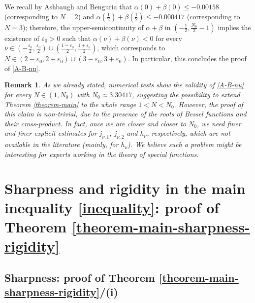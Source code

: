 \documentclass[11pt, reqno]{amsart}
\newtheorem{remark}{Remark}[section]
\numberwithin{equation}{section}
\begin{document}
	We recall by Ashbaugh and Benguria \cite[Appendix 1]{A-B-Duke} that $\alpha(0)+\beta(0)\leq -0.00158$ (corresponding to $N=2$) and 	$\alpha(\frac{1}{2})+\beta(\frac{1}{2})\leq -0.000417$ (corresponding to $N=3$); therefore, the upper-semicontinuity of $\alpha+\beta$ in $(-\frac{1}{2},\frac{N_0}{2}-1)$ implies the existence of $\varepsilon_0>0$ such that $\alpha(\nu)+\beta(\nu)<0$ for every $\nu\in \left(-\frac{\varepsilon_0}{2},\frac{\varepsilon_0}{2}\right)\cup \left(\frac{1-\varepsilon_0}{2},\frac{1+\varepsilon_0}{2}\right)$, which corresponds to $N\in (2-\varepsilon_0,2+\varepsilon_0)\cup (3-\varepsilon_0,3+\varepsilon_0)$. In particular, this concludes the proof of \eqref{A-B-nu}.  
	
	\begin{remark}\label{remark-dimension}\rm 
		As we already stated, numerical tests show the validity of \eqref{A-B-nu} for \textit{every} $N\in (1,N_0)$ with $N_0\approx 3.30417$, suggesting the possibility to extend  Theorem \ref{theorem-main} to the whole range $1<N<N_0.$
		However, the proof of this claim is  non-trivial, due to the presence of the roots of Bessel functions and their cross-product. In fact, once we are closer and closer to $N_0$, we need finer and finer \textit{explicit} estimates for  $j_{\nu,1}$, $j_{\nu,2}$ and $h_\nu$, respectively, which are not available in the literature (mainly, for $h_\nu$). We believe such a problem might  be interesting for experts working in the theory of special functions.  
	\end{remark}
		
		\section{Sharpness and rigidity in the main inequality \eqref{inequality}: proof of Theorem \ref{theorem-main-sharpness-rigidity}}		
		
		\subsection{Sharpness: proof of Theorem \ref{theorem-main-sharpness-rigidity}/(i)}\label{subsection-sharp}
		$\phantom{}$\smallskip
		
\end{document}
